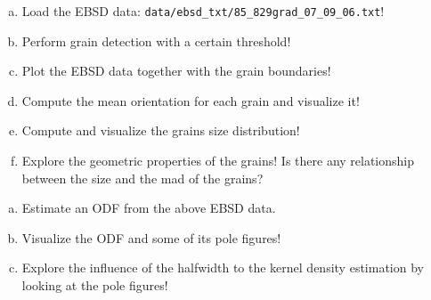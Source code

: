 \begin{frame}

  \begin{Exercise}
    \begin{enumerate}[a)]
    \item Load the EBSD data:
      \texttt{data/ebsd\_txt/85\_829grad\_07\_09\_06.txt}!
    \item Perform grain detection with a certain threshold!
    \item Plot the EBSD data together with the grain boundaries!
    \item Compute the mean orientation for each grain and visualize it!
    \item Compute and visualize the grains size distribution!
    \item Explore the geometric properties of the grains! Is there any
      relationship between the size and the mad of the grains?
    \end{enumerate}
  \end{Exercise}

  \begin{Exercise}
    \begin{enumerate}[a)]
    \item Estimate an ODF from the above EBSD data.
    \item Visualize the ODF and some of its pole figures!
    \item Explore the influence of the halfwidth to the kernel
      density estimation by looking at the pole figures!
    \end{enumerate}
  \end{Exercise}


\end{frame}

